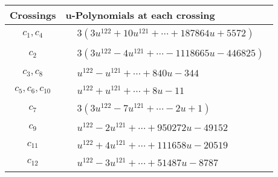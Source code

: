 \documentclass[1p]{elsarticle_modified}
\theoremstyle{definition}
\begin{document}
\begin{tabular}{m{50pt}|m{274pt}}
Crossings & \hspace{64pt}u-Polynomials at each crossing \\
\hline $$\begin{aligned}c_{1},c_{4}\end{aligned}$$&$\begin{aligned}
&3(3 u^{122}+10 u^{121}+\cdots+187864 u+5572)
\end{aligned}$\\
\hline $$\begin{aligned}c_{2}\end{aligned}$$&$\begin{aligned}
&3(3 u^{122}-4 u^{121}+\cdots-1118665 u-446825)
\end{aligned}$\\
\hline $$\begin{aligned}c_{3},c_{8}\end{aligned}$$&$\begin{aligned}
&u^{122}- u^{121}+\cdots+840 u-344
\end{aligned}$\\
\hline $$\begin{aligned}c_{5},c_{6},c_{10}\end{aligned}$$&$\begin{aligned}
&u^{122}+u^{121}+\cdots+8 u-11
\end{aligned}$\\
\hline $$\begin{aligned}c_{7}\end{aligned}$$&$\begin{aligned}
&3(3 u^{122}-7 u^{121}+\cdots-2 u+1)
\end{aligned}$\\
\hline $$\begin{aligned}c_{9}\end{aligned}$$&$\begin{aligned}
&u^{122}-2 u^{121}+\cdots+950272 u-49152
\end{aligned}$\\
\hline $$\begin{aligned}c_{11}\end{aligned}$$&$\begin{aligned}
&u^{122}+4 u^{121}+\cdots+111658 u-20519
\end{aligned}$\\
\hline $$\begin{aligned}c_{12}\end{aligned}$$&$\begin{aligned}
&u^{122}-3 u^{121}+\cdots+51487 u-8787
\end{aligned}$\\
\hline
\end{tabular}\\~\\
\end{document}
